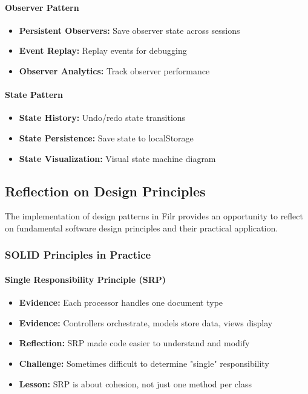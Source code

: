 \documentclass[11pt, a4paper]{article}
\theoremstyle{plain}
\theoremstyle{definition}
\begin{document}
\paragraph{Observer Pattern}
\begin{itemize}
    \item \textbf{Persistent Observers:} Save observer state across sessions
    \item \textbf{Event Replay:} Replay events for debugging
    \item \textbf{Observer Analytics:} Track observer performance
\end{itemize}

\paragraph{State Pattern}
\begin{itemize}
    \item \textbf{State History:} Undo/redo state transitions
    \item \textbf{State Persistence:} Save state to localStorage
    \item \textbf{State Visualization:} Visual state machine diagram
\end{itemize}

\subsection{Reflection on Design Principles}

The implementation of design patterns in Filr provides an opportunity to reflect on fundamental software design principles and their practical application.

\subsubsection{SOLID Principles in Practice}

\paragraph{Single Responsibility Principle (SRP)}
\begin{itemize}
    \item \textbf{Evidence:} Each processor handles one document type
    \item \textbf{Evidence:} Controllers orchestrate, models store data, views display
    \item \textbf{Reflection:} SRP made code easier to understand and modify
    \item \textbf{Challenge:} Sometimes difficult to determine "single" responsibility
    \item \textbf{Lesson:} SRP is about cohesion, not just one method per class
\end{itemize}
\end{document}

